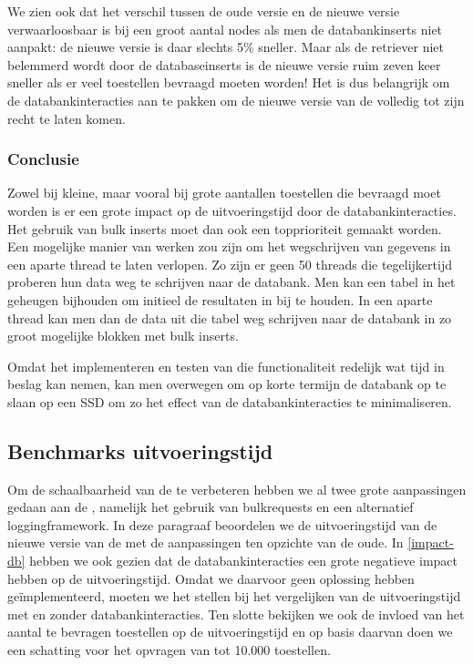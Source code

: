We zien ook dat het verschil tussen de oude versie en de nieuwe versie verwaarloosbaar is bij een groot aantal nodes als men de databankinserts niet aanpakt:
de nieuwe versie is daar slechts 5\% sneller.
Maar als de retriever niet belemmerd wordt door de databaseinserts is de nieuwe versie ruim zeven keer sneller als er veel toestellen bevraagd moeten worden!
Het is dus belangrijk om de databankinteracties aan te pakken om de nieuwe versie van de \nwmretriever{} volledig tot zijn recht te laten komen.

\subsubsection{Conclusie}

Zowel bij kleine, maar vooral bij grote aantallen toestellen die bevraagd moet worden is er een grote impact op de uitvoeringstijd door de databankinteracties.
Het gebruik van bulk inserts moet dan ook een topprioriteit gemaakt worden.
Een mogelijke manier van werken zou zijn om het wegschrijven van gegevens in een aparte thread te laten verlopen.
Zo zijn er geen 50 threads die tegelijkertijd proberen hun data weg te schrijven naar de databank.
Men kan een tabel in het geheugen bijhouden om initieel de resultaten in bij te houden.
In een aparte thread kan men dan de data uit die tabel weg schrijven naar de databank in zo groot mogelijke blokken met bulk inserts.

Omdat het implementeren en testen van die functionaliteit redelijk wat tijd in beslag kan nemen,
kan men overwegen om op korte termijn de databank op te slaan op een SSD om zo het effect van de databankinteracties te minimaliseren.


\subsection{Benchmarks uitvoeringstijd}
\label{uitvoeringstijd-vwall}

Om de schaalbaarheid van de \nwmretriever{} te verbeteren hebben we al twee grote aanpassingen gedaan aan de \nwmretriever{},
namelijk het gebruik van bulkrequests en een alternatief loggingframework.
In deze paragraaf beoordelen we de uitvoeringstijd van de nieuwe versie van de \nwmretriever{} met de aanpassingen ten opzichte van de oude.
In \cref{impact-db} hebben we ook gezien dat de databankinteracties een grote negatieve impact hebben op de uitvoeringstijd.
Omdat we daarvoor geen oplossing hebben geïmplementeerd, moeten we het stellen bij het vergelijken van de uitvoeringstijd met en zonder databankinteracties.
Ten slotte bekijken we ook de invloed van het aantal te bevragen toestellen op de uitvoeringstijd en op basis daarvan
doen we een schatting voor het opvragen van tot 10.000 toestellen.


